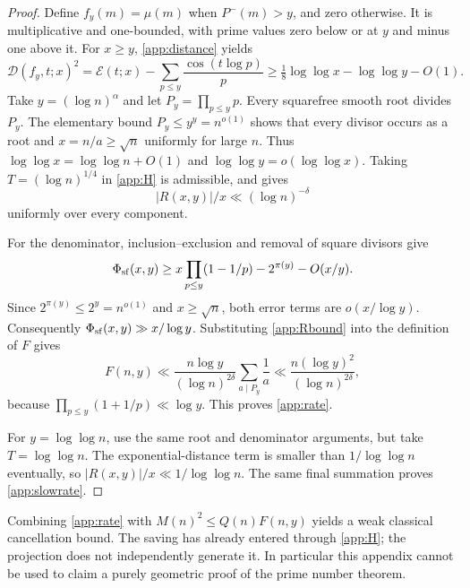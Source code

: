 \begin{proof}
Define $f_y(m)=\mu(m)$ when $P^-(m)>y$, and zero otherwise. It is multiplicative and one-bounded, with prime values zero below or at $y$ and minus one above it. For $x\ge y$, \eqref{app:distance} yields
\[
 \mathcal D(f_y,t;x)^2=\mathcal E(t;x)-\sum_{p\le y}\frac{\cos(t\log p)}p
 \ge\tfrac18\log\log x-\log\log y-O(1).
\]
Take $y=(\log n)^\alpha$ and let $P_y=\prod_{p\le y}p$. Every squarefree smooth root divides $P_y$. The elementary bound $P_y\le y^y=n^{o(1)}$ shows that every divisor occurs as a root and $x=n/a\ge\sqrt n$ uniformly for large $n$. Thus $\log\log x=\log\log n+O(1)$ and $\log\log y=o(\log\log x)$. Taking $T=(\log n)^{1/4}$ in \eqref{app:H} is admissible, and gives
\begin{equation}\label{app:Rbound}
 |R(x,y)|/x\ll(\log n)^{-\delta}
\end{equation}
uniformly over every component.

For the denominator, inclusion--exclusion and removal of square divisors give
\[
 \Phi_{\mathrm{sf}}(x,y)\ge x\prod_{p\le y}(1-1/p)-2^{\pi(y)}-O(x/y).
\]
Since $2^{\pi(y)}\le2^y=n^{o(1)}$ and $x\ge\sqrt n$, both error terms are $o(x/\log y)$. Consequently $\Phi_{\mathrm{sf}}(x,y)\gg x/\log y$. Substituting \eqref{app:Rbound} into the definition of $F$ gives
\[
 F(n,y)\ll\frac{n\log y}{(\log n)^{2\delta}}
             \sum_{a\mid P_y}\frac1a
 \ll\frac{n(\log y)^2}{(\log n)^{2\delta}},
\]
because $\prod_{p\le y}(1+1/p)\ll\log y$. This proves \eqref{app:rate}.

For $y=\log\log n$, use the same root and denominator arguments, but take $T=\log\log n$. The exponential-distance term is smaller than $1/\log\log n$ eventually, so $|R(x,y)|/x\ll1/\log\log n$. The same final summation proves \eqref{app:slowrate}.
\end{proof}

Combining \eqref{app:rate} with $M(n)^2\le Q(n)F(n,y)$ yields a weak classical cancellation bound. The saving has already entered through \eqref{app:H}; the projection does not independently generate it. In particular this appendix cannot be used to claim a purely geometric proof of the prime number theorem.
